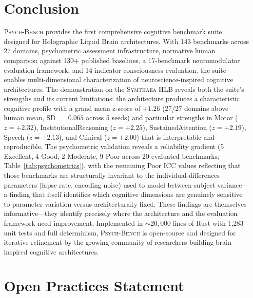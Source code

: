 \documentclass[11pt,letterpaper]{article}
\newcommand{\symthaea}{\textsc{Symthaea}}
\newcommand{\psychbench}{\textsc{Psych-Bench}}
\newcommand{\hlb}{\textsc{HLB}}
\begin{document}
\section{Conclusion}
\label{sec:conclusion}

\psychbench{} provides the first comprehensive cognitive benchmark suite designed for Holographic Liquid Brain architectures. With 143 benchmarks across 27 domains, psychometric assessment infrastructure, normative human comparison against 130+ published baselines, a 17-benchmark neuromodulator evaluation framework, and 14-indicator consciousness evaluation, the suite enables multi-dimensional characterization of neuroscience-inspired cognitive architectures. The demonstration on the \symthaea{} \hlb{} reveals both the suite's strengths and its current limitations: the architecture produces a characteristic cognitive profile with a grand mean z-score of $+1.26$ (27/27 domains above human mean, SD~$= 0.065$ across 5 seeds) and particular strengths in Motor ($z = +2.32$), InstitutionalReasoning ($z = +2.25$), SustainedAttention ($z = +2.19$), Speech ($z = +2.13$), and Clinical ($z = +2.00$) that is interpretable and reproducible. The psychometric validation reveals a reliability gradient (5 Excellent, 4 Good, 2 Moderate, 9 Poor across 20 evaluated benchmarks; Table~\ref{tab:psychometrics}), with the remaining Poor ICC values reflecting that those benchmarks are structurally invariant to the individual-differences parameters (lapse rate, encoding noise) used to model between-subject variance---a finding that itself identifies which cognitive dimensions are genuinely sensitive to parameter variation versus architecturally fixed. These findings are themselves informative---they identify precisely where the architecture and the evaluation framework need improvement. Implemented in ${\sim}20{,}000$ lines of Rust with 1,283 unit tests and full determinism, \psychbench{} is open-source and designed for iterative refinement by the growing community of researchers building brain-inspired cognitive architectures.

\section*{Open Practices Statement}
\end{document}
